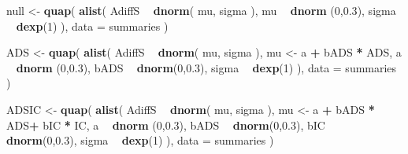 \documentclass[10pt,dvipsnames,enabledeprecatedfontcommands]{scrartcl}
\newenvironment{Shaded}{\begin{snugshade}}{\end{snugshade}}
\newcommand{\KeywordTok}[1]{\textcolor[rgb]{0.13,0.29,0.53}{\textbf{#1}}}
\newcommand{\DataTypeTok}[1]{\textcolor[rgb]{0.13,0.29,0.53}{#1}}
\newcommand{\DecValTok}[1]{\textcolor[rgb]{0.00,0.00,0.81}{#1}}
\newcommand{\FloatTok}[1]{\textcolor[rgb]{0.00,0.00,0.81}{#1}}
\newcommand{\StringTok}[1]{\textcolor[rgb]{0.31,0.60,0.02}{#1}}
\newcommand{\OperatorTok}[1]{\textcolor[rgb]{0.81,0.36,0.00}{\textbf{#1}}}
\newcommand{\NormalTok}[1]{#1}
\begin{document}
\vspace{1mm} \footnotesize

\begin{Shaded}
\begin{Highlighting}[]
\NormalTok{null <-}\StringTok{ }\KeywordTok{quap}\NormalTok{(}
  \KeywordTok{alist}\NormalTok{(}
\NormalTok{    AdiffS }\OperatorTok{~}\StringTok{ }\KeywordTok{dnorm}\NormalTok{( mu, sigma ),}
\NormalTok{    mu }\OperatorTok{~}\StringTok{ }\KeywordTok{dnorm}\NormalTok{ (}\DecValTok{0}\NormalTok{,}\FloatTok{0.3}\NormalTok{),}
\NormalTok{    sigma  }\OperatorTok{~}\StringTok{ }\KeywordTok{dexp}\NormalTok{(}\DecValTok{1}\NormalTok{)}
\NormalTok{  ), }
  \DataTypeTok{data =}\NormalTok{ summaries  }
\NormalTok{)}

\NormalTok{ADS <-}\StringTok{ }\KeywordTok{quap}\NormalTok{(}
  \KeywordTok{alist}\NormalTok{(}
\NormalTok{    AdiffS }\OperatorTok{~}\StringTok{ }\KeywordTok{dnorm}\NormalTok{( mu, sigma ),}
\NormalTok{    mu <-}\StringTok{  }\NormalTok{a }\OperatorTok{+}\StringTok{ }\NormalTok{bADS }\OperatorTok{*}\StringTok{ }\NormalTok{ADS,}
\NormalTok{    a }\OperatorTok{~}\StringTok{ }\KeywordTok{dnorm}\NormalTok{ (}\DecValTok{0}\NormalTok{,}\FloatTok{0.3}\NormalTok{),}
\NormalTok{    bADS }\OperatorTok{~}\StringTok{ }\KeywordTok{dnorm}\NormalTok{(}\DecValTok{0}\NormalTok{,}\FloatTok{0.3}\NormalTok{),}
\NormalTok{    sigma  }\OperatorTok{~}\StringTok{ }\KeywordTok{dexp}\NormalTok{(}\DecValTok{1}\NormalTok{)}
\NormalTok{  ), }
  \DataTypeTok{data =}\NormalTok{ summaries}
\NormalTok{)}

\NormalTok{ADSIC <-}\StringTok{ }\KeywordTok{quap}\NormalTok{(}
  \KeywordTok{alist}\NormalTok{(}
\NormalTok{    AdiffS }\OperatorTok{~}\StringTok{ }\KeywordTok{dnorm}\NormalTok{( mu, sigma ),}
\NormalTok{    mu <-}\StringTok{  }\NormalTok{a }\OperatorTok{+}\StringTok{ }\NormalTok{bADS }\OperatorTok{*}\StringTok{ }\NormalTok{ADS}\OperatorTok{+}\StringTok{ }\NormalTok{bIC }\OperatorTok{*}\StringTok{ }\NormalTok{IC,}
\NormalTok{    a }\OperatorTok{~}\StringTok{ }\KeywordTok{dnorm}\NormalTok{ (}\DecValTok{0}\NormalTok{,}\FloatTok{0.3}\NormalTok{),}
\NormalTok{    bADS }\OperatorTok{~}\StringTok{ }\KeywordTok{dnorm}\NormalTok{(}\DecValTok{0}\NormalTok{,}\FloatTok{0.3}\NormalTok{),}
\NormalTok{    bIC }\OperatorTok{~}\StringTok{ }\KeywordTok{dnorm}\NormalTok{(}\DecValTok{0}\NormalTok{,}\FloatTok{0.3}\NormalTok{),}
\NormalTok{    sigma  }\OperatorTok{~}\StringTok{ }\KeywordTok{dexp}\NormalTok{(}\DecValTok{1}\NormalTok{)}
\NormalTok{  ), }
  \DataTypeTok{data =}\NormalTok{ summaries}
\NormalTok{)}



\end{Highlighting}
\end{Shaded}
\end{document}
